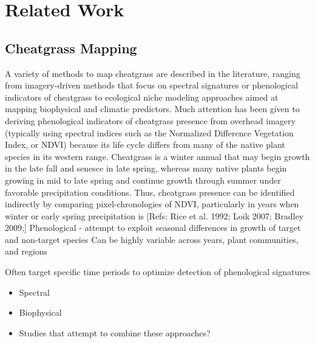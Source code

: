 \def\year{2017}\relax \documentclass[letterpaper]{article}
\begin{document}
\section{Related Work}
\subsection{Cheatgrass Mapping}
A variety of methods to map cheatgrass are described in the literature, ranging from imagery-driven methods that focus on spectral signatures or phenological indicators of cheatgrass to ecological niche modeling approaches aimed at mapping biophysical and climatic predictors. Much attention has been given to deriving phenological indicators of cheatgrass presence from overhead imagery (typically using spectral indices such as the Normalized Difference Vegetation Index, or NDVI) because its life cycle differs from many of the native plant species in its western range. Cheatgrass is a winter annual that may begin growth in the late fall and senesce in late spring, whereas many native plants begin growing in mid to late spring and continue growth through summer under favorable precipitation conditions. Thus, cheatgrass presence can be identified indirectly by comparing pixel-chronologies of NDVI, particularly in years when winter or early spring precipitation is 
[Refs: Rice et al. 1992; Loik 2007; Bradley 2009;]
Phenological - attempt to exploit seasonal differences in growth of target and non-target species
Can be highly variable across years, plant communities, and regions

Often target specific time periods to optimize detection of phenological signatures
\begin{itemize}
\item Spectral
\item Biophysical
\item Studies that attempt to combine these approaches?
\end{itemize}
\end{document}
